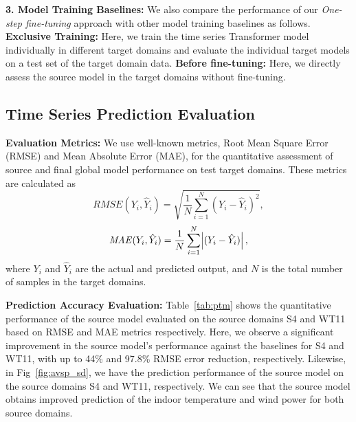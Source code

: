 \documentclass[letterpaper]{article} %
\begin{document}
\textbf{3. Model Training Baselines:} We also compare the performance of our \emph{One-step fine-tuning} approach with other model training baselines as follows. \textbf{Exclusive Training:} Here, we train the time series Transformer model individually in different target domains and evaluate the individual target models on a test set of the target domain data. \textbf{Before fine-tuning:} Here, we directly assess the source model in the target domains without fine-tuning.

\subsection{Time Series Prediction Evaluation}
\hspace{0.12in}\textbf{Evaluation Metrics:}
We use well-known metrics, Root Mean Square Error (RMSE) and Mean Absolute Error (MAE), for the quantitative assessment of source and final global model performance on test target domains. These metrics are calculated as
\begin{equation}
    \mathit{RMSE}(Y_{i}, \hat{Y}_{i}) = \sqrt{\frac{1}{N}\sum_{i=1}^{N}(Y_{i} - \hat{Y}_{i})^2},
\end{equation}
\begin{equation}
   \mathit{MAE}(Y_{i}, \hat{Y}_{i}) = \frac{1}{N}\sum_{i=1}^{N}\abs{(Y_{i} - \hat{Y}_{i})},
\end{equation}
where $Y_{i}$ and $\hat{Y}_{i}$ are the actual and predicted output, and $N$ is the total number of samples in the target domains.

\textbf{Prediction Accuracy Evaluation:} Table~\ref{tab:ptm} shows the quantitative performance of the source model evaluated on the source domains S4 and WT11 based on RMSE and MAE metrics respectively. Here, we observe a significant improvement in the source model's performance against the baselines for S4 and WT11, with up to 44\% and 97.8\% RMSE error reduction, respectively. Likewise, in Fig~\ref{fig:avsp_sd}, we have the prediction performance of the source model on the source domains S4 and WT11, respectively. We can see that the source model obtains improved prediction of the indoor temperature and wind power for both source domains.
\end{document}
